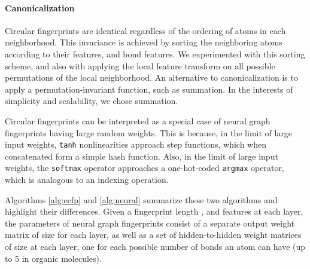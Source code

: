 \documentclass{article}
\begin{document}
\paragraph{Canonicalization}
Circular fingerprints are identical regardless of the ordering of atoms in each neighborhood.
This invariance is achieved by sorting the neighboring atoms according to their features, and bond features.
We experimented with this sorting scheme, and also with applying the local feature transform on all possible permutations of the local neighborhood.
An alternative to canonicalization is to apply a permutation-invariant function, such as summation.
In the interests of simplicity and scalability, we chose summation.


\label{sec:random is equivalent}
Circular fingerprints can be interpreted as a special case of neural graph fingerprints having large random weights.
This is because, in the limit of large input weights, \texttt{tanh} nonlinearities approach step functions, which when concatenated form a simple hash function.
Also, in the limit of large input weights, the \texttt{softmax} operator approaches a one-hot-coded \texttt{argmax} operator, which is analogous to an indexing operation.

Algorithms \ref{alg:ecfp} and \ref{alg:neural} summarize these two algorithms and highlight their differences.
Given a fingerprint length , and  features at each layer, the parameters of neural graph fingerprints consist of a separate output weight matrix of size  for each layer, as well as a set of hidden-to-hidden weight matrices of size  at each layer, one for each possible number of bonds an atom can have (up to 5 in organic molecules).
\end{document}
